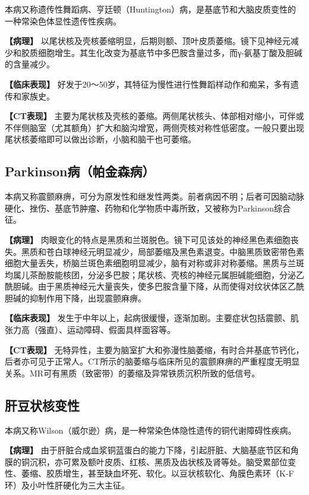 本病又称遗传性舞蹈病、亨廷顿（Huntington）病，是基底节和大脑皮质变性的一种常染色体显性遗传性疾病。

\textbf{【病理】}
以尾状核及壳核萎缩明显，后期则额、顶叶皮质萎缩。镜下见神经元减少和胶质细胞增生。其生化改变为基底节中多巴胺含量过多，而γ-氨基丁酸及胆碱的含量减少。

\textbf{【临床表现】}
好发于20～50岁，其特征为慢性进行性舞蹈样动作和痴呆，多有遗传和家族史。

\textbf{【CT表现】}
主要为尾状核及壳核的萎缩。两侧尾状核头、体部相对缩小，可伴或不伴侧脑室（尤其额角）扩大和脑沟增宽，两侧壳核对称性低密度。一般只要出现尾状核萎缩即可以做出诊断，小脑和脑干也可萎缩。

\subsection{Parkinson病（帕金森病）}

本病又称震颤麻痹，可分为原发性和继发性两类。前者病因不明；后者可因脑动脉硬化、挫伤、基底节肿瘤、药物和化学物质中毒所致，又被称为Parkinson综合征。

\textbf{【病理】}
肉眼变化的特点是黑质和兰斑脱色。镜下可见该处的神经黑色素细胞丧失。黑质和苍白球神经元明显减少，局部萎缩及黑色素退变。中脑黑质致密带色素细胞大量丢失，桥脑兰斑色素细胞明显减少，脑有对称或非对称萎缩。黑质与兰斑均属儿茶酚胺能核团，分泌多巴胺；尾状核、壳核的神经元属胆碱能细胞，分泌乙酰胆碱。由于黑质神经元大量丧失，使多巴胺含量下降，从而使得对纹状体区乙酰胆碱的抑制作用下降，出现震颤麻痹。

\textbf{【临床表现】}
发生于中年以上，起病很缓慢，逐渐加剧。主要症状包括震颤、肌张力高（强直）、运动障碍、假面具样面容等。

\textbf{【CT表现】}
无特异性，主要为脑室扩大和弥漫性脑萎缩，有时合并基底节钙化，后者亦可见于正常人。CT所示的脑萎缩与临床所见的震颤麻痹的严重程度无明显关系。MR可有黑质（致密带）的萎缩及异常铁质沉积所致的低信号。

\subsection{肝豆状核变性}

本病又称Wilson（威尔逊）病，是一种常染色体隐性遗传的铜代谢障碍性疾病。

\textbf{【病理】}
由于肝脏合成血浆铜蓝蛋白的能力下降，引起肝脏、大脑基底节区和角膜的铜沉积，亦可累及额叶皮质、红核、黑质及齿状核及肾等处。脑受累部位变性、萎缩、胶质增生，甚至缺血坏死、软化。以豆状核软化、角膜色素环（K-F环）及小叶性肝硬化为三大主征。

